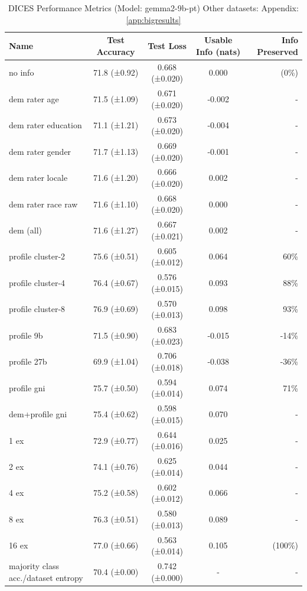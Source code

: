 \documentclass[11pt]{article}
\begin{document}
\begin{table}[h]
\centering
\small
\begin{tabular}{|l|c|c|c|r|}
\hline
Name & Test Accuracy & Test Loss & Usable Info (nats) & Info Preserved \\
\hline
no info & 71.8 (±0.92) & 0.668 (±0.020) & 0.000 & (0\%) \\
dem rater age & 71.5 (±1.09) & 0.671 (±0.020) & -0.002 & - \\
dem rater education & 71.1 (±1.21) & 0.673 (±0.020) & -0.004 & - \\
dem rater gender & 71.7 (±1.13) & 0.669 (±0.020) & -0.001 & - \\
dem rater locale & 71.6 (±1.20) & 0.666 (±0.020) & 0.002 & - \\
dem rater race raw & 71.6 (±1.10) & 0.668 (±0.020) & 0.000 & - \\
dem (all) & 71.6 (±1.27) & 0.667 (±0.021) & 0.002 & - \\
profile cluster-2 & 75.6 (±0.51) & 0.605 (±0.012) & 0.064 & 60\% \\
profile cluster-4 & 76.4 (±0.67) & 0.576 (±0.015) & 0.093 & 88\% \\
profile cluster-8 & 76.9 (±0.69) & 0.570 (±0.013) & 0.098 & 93\% \\
profile 9b & 71.5 (±0.90) & 0.683 (±0.023) & -0.015 & -14\% \\
profile 27b & 69.9 (±1.04) & 0.706 (±0.018) & -0.038 & -36\% \\
profile gni & 75.7 (±0.50) & 0.594 (±0.014) & 0.074 & 71\% \\
dem+profile gni & 75.4 (±0.62) & 0.598 (±0.015) & 0.070 & - \\
1 ex & 72.9 (±0.77) & 0.644 (±0.016) & 0.025 & - \\
2 ex & 74.1 (±0.76) & 0.625 (±0.014) & 0.044 & - \\
4 ex & 75.2 (±0.58) & 0.602 (±0.012) & 0.066 & - \\
8 ex & 76.3 (±0.51) & 0.580 (±0.013) & 0.089 & - \\
16 ex & 77.0 (±0.66) & 0.563 (±0.014) & 0.105 & (100\%) \\
majority class acc./dataset entropy & 70.4 (±0.00) & 0.742 (±0.000) & - & - \\
\hline
\end{tabular}
\caption{DICES Performance Metrics (Model: gemma2-9b-pt) Other datasets: Appendix: \ref{app:bigresults}}
\label{tab:performance_dices}
\end{table}
\end{document}
